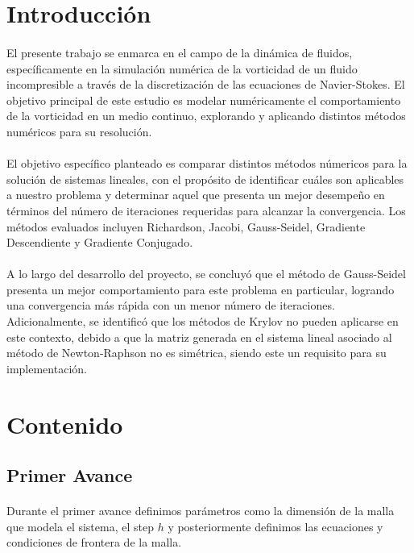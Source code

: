\documentclass{article}
\begin{document}
  \section*{Introducción}
  \paragraph{}
  El presente trabajo se enmarca en el campo de la dinámica de fluidos, específicamente en la simulación numérica de la vorticidad de un fluido incompresible a través de la discretización de las ecuaciones de Navier-Stokes. El objetivo principal de este estudio es modelar numéricamente el comportamiento de la vorticidad en un medio continuo, explorando y aplicando distintos métodos numéricos para su resolución.

  \paragraph{}
  El objetivo específico planteado es comparar distintos métodos númericos para la solución de sistemas lineales, con el propósito de identificar cuáles son aplicables a nuestro problema y determinar aquel que presenta un mejor desempeño en términos del número de iteraciones requeridas para alcanzar la convergencia. Los métodos evaluados incluyen Richardson, Jacobi, Gauss-Seidel, Gradiente Descendiente y Gradiente Conjugado.
  
  \paragraph{}
  A lo largo del desarrollo del proyecto, se concluyó que el método de Gauss-Seidel presenta un mejor comportamiento para este problema en particular, logrando una convergencia más rápida con un menor número de iteraciones. Adicionalmente, se identificó que los métodos de Krylov no pueden aplicarse en este contexto, debido a que la matriz generada en el sistema lineal asociado al método de Newton-Raphson no es simétrica, siendo este un requisito para su implementación.
  
  \section*{Contenido}

  \subsection*{Primer Avance}
  \paragraph{}
  Durante el primer avance definimos parámetros como la dimensión de la malla que modela el sistema, el step $h$ y posteriormente definimos las ecuaciones y condiciones de frontera de la malla.
\end{document}
